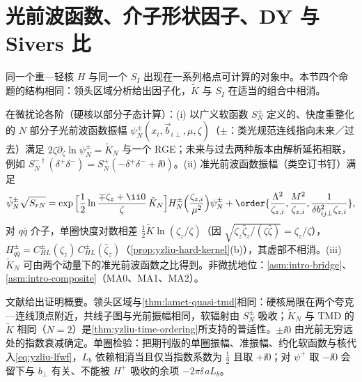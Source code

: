 \section{光前波函数、介子形状因子、DY 与 Sivers 比}\label{sec:yzliu-exclusive}

同一个重—轻核 $H$ 与同一个 $S_I$ 出现在一系列格点可计算的对象中。本节四个命题的结构相同：领头区域分析给出因子化，$\tilde K$ 与 $S_I$ 在适当的组合中相消。

\begin{proposition}\label{prop:yzliu-lfwf}
在微扰论各阶（硬核以部分子态计算）：(i) 以广义软函数 $S^\pm_N$ 定义的、快度重整化的 $N$ 部分子光前波函数振幅 $\psi^\pm_N(x_i,\vec b_{i\perp},\mu,\zeta)$（$\pm$：类光规范连线指向未来／过去）满足 $2\zeta\partial_\zeta\ln\psi^\pm_N=\tilde K_N$ 与一个 RGE；未来与过去两种版本由解析延拓相联，例如 $S^{-\dagger}_N(\delta^+\delta^-)=S^+_N(-\delta^+\delta^-+\ii0)$。(ii) 准光前波函数振幅（类空订书钉）满足
\begin{equation}\label{eq:yzliu-lfwf}
\tilde\psi^\pm_N\sqrt{S_{rN}}=\exp\Big[\frac12\ln\frac{\mp\zeta_z+\ii0}{\zeta}\,\tilde K_N\Big]H^\pm_N\Big(\frac{\zeta_{z,i}}{\mu^2}\Big)\psi^\pm_N+\order{\frac{\Lambda^2}{\zeta_{z,i}},\frac{M^2}{\zeta_{z,i}},\frac1{\delta b_{ij\perp}^2\zeta_{z,i}}},
\end{equation}
对 $q\bar q$ 介子，单圈快度对数相差 $\frac12\tilde K\ln(\zeta_z/\zeta)$（因 $\sqrt{\zeta_z\bar\zeta_z/(\zeta\bar\zeta)}=\zeta_z/\zeta$），$H^\pm_{q\bar q}=C^\pm_{HL}(\zeta_z)\,C^\pm_{HL}(\bar\zeta_z)$（\cref{prop:yzliu-hard-kernel}(b)），其虚部不相消。(iii) $\tilde K_N$ 可由两个动量下的准光前波函数之比得到。非微扰地位：\cref{asm:intro-bridge}、\cref{asm:intro-composite}（MA0、MA1、MA2）。
\end{proposition}

\begin{proofsketch}
文献\cite[第~II--V~节]{Ji:2021znw}给出证明概要。领头区域与\cref{thm:lamet-quasi-tmd}相同：硬核局限在两个夸克—连线顶点附近，共线子图与光前振幅相同，软辐射由 $S^\pm_N$ 吸收；$\tilde K_N$ 与 TMD 的 $\tilde K$ 相同（$N=2$）是\cref{thm:yzliu-time-ordering}所支持的普适性。$\pm\ii0$ 由光前无穷远处的指数衰减确定。单圈检验：把期刊版的单圈振幅、准振幅、约化软函数与核代入\cref{eq:yzliu-lfwf}，$L_b$ 依赖相消当且仅当指数系数为 $\frac12$ 且取 $+\ii0$；对 $\psi^+$ 取 $-\ii0$ 会留下与 $b_\perp$ 有关、不能被 $H^+$ 吸收的余项 $-2\pi\ii\,aL_b$。
\end{proofsketch}

